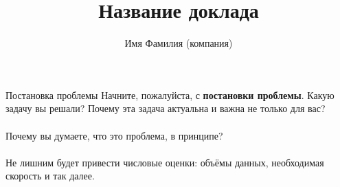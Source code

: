 \documentclass[aspectratio=169]{beamer}
\title{Название доклада}
\author{Имя Фамилия (компания)}
\begin{document}
\begin{frame}
\titlepage
\end{frame}

\begin{frame}{Постановка проблемы}
Начните, пожалуйста, с \textbf{постановки проблемы}. Какую задачу вы решали? Почему эта задача актуальна и важна не только для вас? \\~\\
Почему вы думаете, что это проблема, в принципе? \\~\\
Не лишним будет привести числовые оценки: объёмы данных, необходимая скорость и так далее.
\end{frame}
\end{document}

